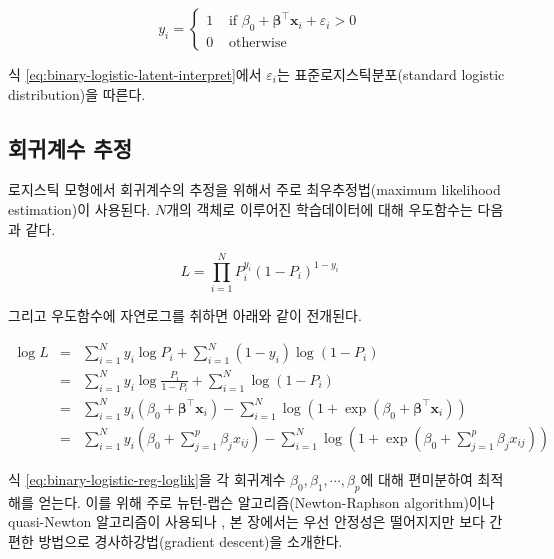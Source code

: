 \documentclass[
]{book}
\begin{document}
\begin{equation}
y_i = \begin{cases}
1 & \text{ if } \beta_0 + \boldsymbol\beta^\top \mathbf{x}_i + \varepsilon_i > 0 \\
0 & \text{ otherwise }
\end{cases}
\label{eq:binary-logistic-latent-interpret}
\end{equation}

식 \eqref{eq:binary-logistic-latent-interpret}에서 \(\varepsilon_i\)는 표준로지스틱분포(standard logistic distribution)을 따른다.

\hypertarget{binary-logistic-reg-estimation}{%
\subsection{회귀계수 추정}\label{binary-logistic-reg-estimation}}

로지스틱 모형에서 회귀계수의 추정을 위해서 주로 최우추정법(maximum likelihood estimation)이 사용된다. \(N\)개의 객체로 이루어진 학습데이터에 대해 우도함수는 다음과 같다.

\begin{equation*}
L = \prod_{i = 1}^{N} P_i^{y_i} (1 - P_i)^{1 - y_i}
\end{equation*}

그리고 우도함수에 자연로그를 취하면 아래와 같이 전개된다.

\begin{eqnarray}
\log L &=& \sum_{i = 1}^{N} y_i \log P_i + \sum_{i = 1}^{N} (1 - y_i) \log (1 - P_i)\\
&=& \sum_{i = 1}^{N} y_i \log \frac{P_i}{1 - P_i} + \sum_{i = 1}^{N} \log (1 - P_i)\\
&=& \sum_{i = 1}^{N} y_i (\beta_0 + \boldsymbol\beta^\top \mathbf{x}_i) - \sum_{i = 1}^{N}  \log (1 + \exp (\beta_0 + \boldsymbol\beta^\top \mathbf{x}_i) )\\
&=& \sum_{i = 1}^{N} y_i \left(\beta_0 + \sum_{j = 1}^{p} \beta_j x_{ij} \right) - \sum_{i = 1}^{N}  \log \left(1 + \exp\left(\beta_0 + \sum_{j = 1}^{p} \beta_j x_{ij}\right)\right)
\label{eq:binary-logistic-reg-loglik}
\end{eqnarray}

식 \eqref{eq:binary-logistic-reg-loglik}을 각 회귀계수 \(\beta_0, \beta_1, \cdots, \beta_p\)에 대해 편미분하여 최적해를 얻는다. 이를 위해 주로 뉴턴-랩슨 알고리즘(Newton-Raphson algorithm)이나 quasi-Newton 알고리즘이 사용되나 \citep{jun2012datamining}, 본 장에서는 우선 안정성은 떨어지지만 보다 간편한 방법으로 경사하강법(gradient descent)을 소개한다.
\end{document}

